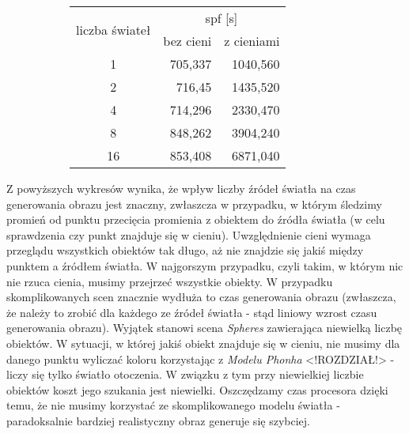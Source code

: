 \begin{figure}[!htb]
\advance\leftskip-2cm
\begin{subfigure}{.5\textwidth}
\end{subfigure}
\hspace{2cm}
\begin{subfigure}{.5\textwidth}
		\begin{longtable}{|c|r|r|} \hline
		\multirow{2}{*}{liczba świateł} & \multicolumn{2}{|c|}{spf [s]} \\ \cline{2-3}
	    & bez cieni & z cieniami \\ \hline
	    1 & 705,337 & 1040,560 \\
	    2 & 716,45 & 1435,520 \\
		4 & 714,296 & 2330,470 \\
		8 & 848,262 & 3904,240 \\
		16 & 853,408 & 6871,040 \\
		\hline
		\end{longtable}
\end{subfigure}
\end{figure}

Z powyższych wykresów wynika, że wpływ liczby źródeł światła na czas generowania obrazu jest znaczny, zwłaszcza w przypadku, w którym śledzimy promień od punktu przecięcia promienia z obiektem do źródła światła (w celu sprawdzenia czy punkt znajduje się w cieniu). Uwzględnienie cieni wymaga przeglądu wszystkich obiektów tak długo, aż nie znajdzie się jakiś między punktem a źródłem światła. W najgorszym przypadku, czyli takim, w którym nic nie rzuca cienia, musimy przejrzeć wszystkie obiekty. W przypadku skomplikowanych scen znacznie wydłuża to czas generowania obrazu (zwłaszcza, że należy to zrobić dla każdego ze źródeł światła - stąd liniowy wzrost czasu generowania obrazu). Wyjątek stanowi scena \emph{Spheres} zawierająca niewielką liczbę obiektów. W sytuacji, w której jakiś obiekt znajduje się w cieniu, nie musimy dla danego punktu wyliczać koloru korzystając z \emph{Modelu Phonha} <!ROZDZIAŁ!> - liczy się tylko światło otoczenia. W związku z tym przy niewielkiej liczbie obiektów koszt jego szukania jest niewielki. Oszczędzamy czas procesora dzięki temu, że nie musimy korzystać ze skomplikowanego modelu światła - paradoksalnie bardziej realistyczny obraz generuje się szybciej.

